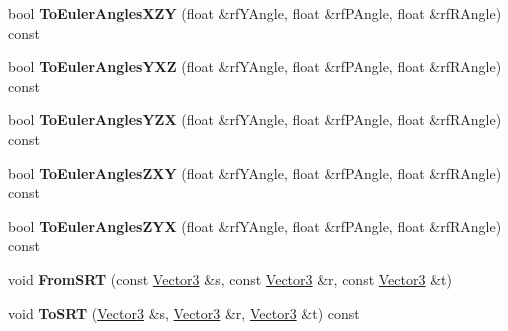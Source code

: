 \begin{DoxyCompactItemize}
\item 
bool {\bfseries To\+Euler\+Angles\+X\+ZY} (float \&rf\+Y\+Angle, float \&rf\+P\+Angle, float \&rf\+R\+Angle) const \hypertarget{class_i_dream_sky_1_1_matrix4_a52358a67ff4c6a29d705a6c51aa125e1}{}\label{class_i_dream_sky_1_1_matrix4_a52358a67ff4c6a29d705a6c51aa125e1}

\item 
bool {\bfseries To\+Euler\+Angles\+Y\+XZ} (float \&rf\+Y\+Angle, float \&rf\+P\+Angle, float \&rf\+R\+Angle) const \hypertarget{class_i_dream_sky_1_1_matrix4_aa420cd2a91484f166562ad207889d320}{}\label{class_i_dream_sky_1_1_matrix4_aa420cd2a91484f166562ad207889d320}

\item 
bool {\bfseries To\+Euler\+Angles\+Y\+ZX} (float \&rf\+Y\+Angle, float \&rf\+P\+Angle, float \&rf\+R\+Angle) const \hypertarget{class_i_dream_sky_1_1_matrix4_aed734e6432be26a67eeed45f7719bc3c}{}\label{class_i_dream_sky_1_1_matrix4_aed734e6432be26a67eeed45f7719bc3c}

\item 
bool {\bfseries To\+Euler\+Angles\+Z\+XY} (float \&rf\+Y\+Angle, float \&rf\+P\+Angle, float \&rf\+R\+Angle) const \hypertarget{class_i_dream_sky_1_1_matrix4_ac2e7d3aaf03386a1d659728a5452a09b}{}\label{class_i_dream_sky_1_1_matrix4_ac2e7d3aaf03386a1d659728a5452a09b}

\item 
bool {\bfseries To\+Euler\+Angles\+Z\+YX} (float \&rf\+Y\+Angle, float \&rf\+P\+Angle, float \&rf\+R\+Angle) const \hypertarget{class_i_dream_sky_1_1_matrix4_aba5b2e72ed288640b742bb015811df87}{}\label{class_i_dream_sky_1_1_matrix4_aba5b2e72ed288640b742bb015811df87}

\item 
void {\bfseries From\+S\+RT} (const \hyperlink{class_i_dream_sky_1_1_vector3}{Vector3} \&s, const \hyperlink{class_i_dream_sky_1_1_vector3}{Vector3} \&r, const \hyperlink{class_i_dream_sky_1_1_vector3}{Vector3} \&t)\hypertarget{class_i_dream_sky_1_1_matrix4_a87b8546e10d6885b8bb7eb373549a870}{}\label{class_i_dream_sky_1_1_matrix4_a87b8546e10d6885b8bb7eb373549a870}

\item 
void {\bfseries To\+S\+RT} (\hyperlink{class_i_dream_sky_1_1_vector3}{Vector3} \&s, \hyperlink{class_i_dream_sky_1_1_vector3}{Vector3} \&r, \hyperlink{class_i_dream_sky_1_1_vector3}{Vector3} \&t) const \hypertarget{class_i_dream_sky_1_1_matrix4_af3c33a1a568cfb1e33e39a83c02b1ac1}{}\label{class_i_dream_sky_1_1_matrix4_af3c33a1a568cfb1e33e39a83c02b1ac1}


\end{DoxyCompactItemize}
